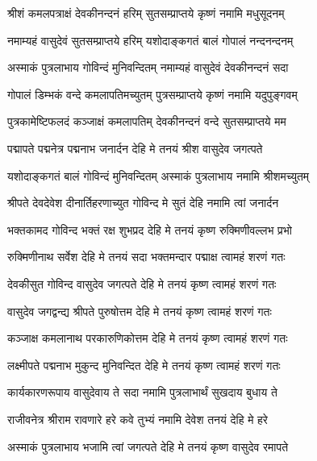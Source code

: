 

\twolineshloka
{श्रीशं कमलपत्राक्षं देवकीनन्दनं हरिम्}
{सुतसम्प्राप्तये कृष्णं नमामि मधुसूदनम्}%

\twolineshloka
{नमाम्यहं वासुदेवं सुतसम्प्राप्तये हरिम्}
{यशोदाङ्कगतं बालं गोपालं नन्दनन्दनम्}%

\twolineshloka
{अस्माकं पुत्रलाभाय गोविन्दं मुनिवन्दितम्}
{नमाम्यहं वासुदेवं देवकीनन्दनं सदा}%

\twolineshloka
{गोपालं डिम्भकं वन्दे कमलापतिमच्युतम्}
{पुत्रसम्प्राप्तये कृष्णं नमामि यदुपुङ्गवम्}%

\twolineshloka
{पुत्रकामेष्टिफलदं कञ्जाक्षं कमलापतिम्}
{देवकीनन्दनं वन्दे सुतसम्प्राप्तये मम}%

\twolineshloka
{पद्मापते पद्मनेत्र पद्मनाभ जनार्दन}
{देहि मे तनयं श्रीश वासुदेव जगत्पते}%

\twolineshloka
{यशोदाङ्कगतं बालं गोविन्दं मुनिवन्दितम्}
{अस्माकं पुत्रलाभाय नमामि श्रीशमच्युतम्}%

\twolineshloka
{श्रीपते देवदेवेश दीनार्तिहरणाच्युत}
{गोविन्द मे सुतं देहि नमामि त्वां जनार्दन}%

\twolineshloka
{भक्तकामद गोविन्द भक्तं रक्ष शुभप्रद}
{देहि मे तनयं कृष्ण रुक्मिणीवल्लभ प्रभो}%

\twolineshloka
{रुक्मिणीनाथ सर्वेश देहि मे तनयं सदा}
{भक्तमन्दार पद्माक्ष त्वामहं शरणं गतः}%

\twolineshloka
{देवकीसुत गोविन्द वासुदेव जगत्पते}
{देहि मे तनयं कृष्ण त्वामहं शरणं गतः}%

\twolineshloka
{वासुदेव जगद्वन्द्य श्रीपते पुरुषोत्तम}
{देहि मे तनयं कृष्ण त्वामहं शरणं गतः}%

\twolineshloka
{कञ्जाक्ष कमलानाथ परकारुणिकोत्तम}
{देहि मे तनयं कृष्ण त्वामहं शरणं गतः}%

\twolineshloka
{लक्ष्मीपते पद्मनाभ मुकुन्द मुनिवन्दित}
{देहि मे तनयं कृष्ण त्वामहं शरणं गतः}%

\twolineshloka
{कार्यकारणरूपाय वासुदेवाय ते सदा}
{नमामि पुत्रलाभार्थं सुखदाय बुधाय ते}%

\twolineshloka
{राजीवनेत्र श्रीराम रावणारे हरे कवे}
{तुभ्यं नमामि देवेश तनयं देहि मे हरे}%

\twolineshloka
{अस्माकं पुत्रलाभाय भजामि त्वां जगत्पते}
{देहि मे तनयं कृष्ण वासुदेव रमापते}%

